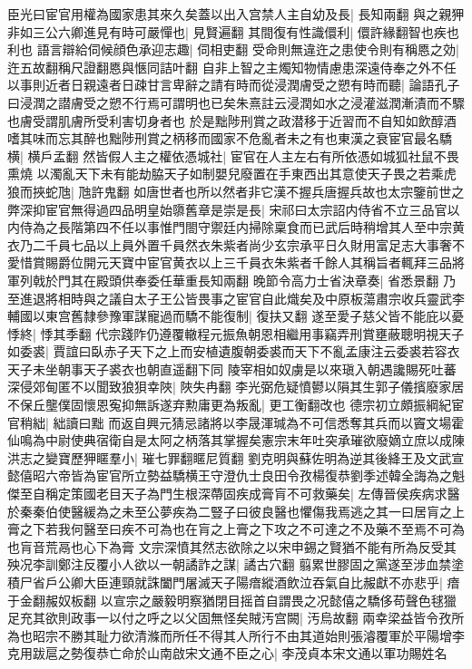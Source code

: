 臣光曰宦官用權為國家患其來久矣蓋以出入宫禁人主自幼及長|{
	長知兩翻}
與之親狎非如三公六卿進見有時可嚴憚也|{
	見賢遍翻}
其間復有性識儇利|{
	儇許緣翻智也疾也利也}
語言辯給伺候顔色承迎志趣|{
	伺相吏翻}
受命則無違迕之患使令則有稱㥦之効|{
	迕五故翻稱尺證翻㥦與愜同詰叶翻}
自非上智之主燭知物情慮患深遠侍奉之外不任以事則近者日親遠者日疎甘言卑辭之請有時而從浸潤膚受之愬有時而聽|{
	論語孔子曰浸潤之譛膚受之愬不行焉可謂明也已矣朱熹註云浸潤如水之浸灌滋潤漸漬而不驟也膚受謂肌膚所受利害切身者也}
於是黜陟刑賞之政潜移于近習而不自知如飲醇酒嗜其味而忘其醉也黜陟刑賞之柄移而國家不危亂者未之有也東漢之衰宦官最名驕横|{
	横戶孟翻}
然皆假人主之權依憑城社|{
	宦官在人主左右有所依憑如城狐社鼠不畏熏燒}
以濁亂天下未有能劫脇天子如制嬰兒廢置在手東西出其意使天子畏之若乘虎狼而挾蛇虺|{
	虺許鬼翻}
如唐世者也所以然者非它漢不握兵唐握兵故也太宗鑒前世之弊深抑宦官無得過四品明皇始隳舊章是崇是長|{
	宋祁曰太宗詔内侍省不立三品官以内侍為之長階第四不任以事惟門閤守禦廷内掃除稟食而已武后時稍增其人至中宗黄衣乃二千員七品以上員外置千員然衣朱紫者尚少玄宗承平日久財用富足志大事奢不愛惜賞賜爵位開元天寶中宦官黄衣以上三千員衣朱紫者千餘人其稱旨者輒拜三品將軍列戟於門其在殿頭供奉委任華重長知兩翻}
晚節令高力士省決章奏|{
	省悉景翻}
乃至進退將相時與之議自太子王公皆畏事之宦官自此熾矣及中原板蕩肅宗收兵靈武李輔國以東宫舊隸參豫軍謀寵過而驕不能復制|{
	復扶又翻}
遂至愛子慈父皆不能庇以憂悸終|{
	悸其季翻}
代宗踐阼仍遵覆轍程元振魚朝恩相繼用事竊弄刑賞壅蔽聰明視天子如委裘|{
	賈誼曰臥赤子天下之上而安植遺腹朝委裘而天下不亂孟康注云委裘若容衣天子未坐朝事天子裘衣也朝直遥翻下同}
陵宰相如奴虜是以來瑱入朝遇讒賜死吐蕃深侵郊甸匿不以聞致狼狽幸陜|{
	陜失冉翻}
李光弼危疑憤鬰以隕其生郭子儀擯廢家居不保丘壟僕固懷恩寃抑無訴遂弃勲庸更為叛亂|{
	更工衡翻改也}
德宗初立頗振綱紀宦官稍絀|{
	絀讀曰黜}
而返自興元猜忌諸將以李晟渾瑊為不可信悉奪其兵而以竇文場霍仙鳴為中尉使典宿衛自是太阿之柄落其掌握矣憲宗末年吐突承璀欲廢嫡立庶以成陳洪志之變寶歷狎䁥羣小|{
	璀七罪翻䁥尼質翻}
劉克明與蘇佐明為逆其後絳王及文武宣懿僖昭六帝皆為宦官所立勢益驕横王守澄仇士良田令孜楊復恭劉季述韓全誨為之魁傑至自稱定策國老目天子為門生根深蔕固疾成膏肓不可救藥矣|{
	左傳晉侯疾病求醫於秦秦伯使醫緩為之未至公夢疾為二豎子曰彼良醫也懼傷我焉逃之其一曰居肓之上膏之下若我何醫至曰疾不可為也在肓之上膏之下攻之不可達之不及藥不至焉不可為也肓音荒鬲也心下為膏}
文宗深憤其然志欲除之以宋申錫之賢猶不能有所為反受其殃况李訓鄭注反覆小人欲以一朝譎詐之謀|{
	譎古穴翻}
翦累世膠固之黨遂至涉血禁塗積尸省戶公卿大臣連頸就誅闔門屠滅天子陽瘖縱酒飲泣吞氣自比赧獻不亦悲乎|{
	瘖于金翻赧奴板翻}
以宣宗之嚴毅明察猶閉目摇首自謂畏之况懿僖之驕侈苟聲色毬獵足充其欲則政事一以付之呼之以父固無怪矣賊汚宫闕|{
	汚烏故翻}
兩幸梁益皆令孜所為也昭宗不勝其耻力欲清滌而所任不得其人所行不由其道始則張濬覆軍於平陽增李克用跋扈之勢復恭亡命於山南啟宋文通不臣之心|{
	李茂貞本宋文通以軍功賜姓名}
